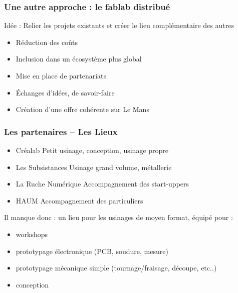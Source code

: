 \documentclass[10pt, compress]{beamer}
\begin{document}
	\begin{frame}
		\frametitle{Une autre approche : le fablab distribué}

		\begin{center}
			\alert{Idée :} Relier les projets existants et créer le lieu complémentaire des autres
		\end{center}

		\pause
		\begin{itemize}
			\item Réduction des coûts
			\item Inclusion dans un \alert{écosystème plus global}
			\item Mise en place de \alert{partenariats}
			\item \alert{Échanges d'idées}, de savoir-faire
			\item Création d'une \alert{offre cohérente} sur Le Mans
		\end{itemize}
	\end{frame}

	\begin{frame}
		\frametitle{Les partenaires -- Les Lieux}

		\begin{itemize}
			\item \alert{Créalab} Petit usinage, conception, usinage propre
			\item \alert{Les Subsistances} Usinage grand volume, métallerie
			\item \alert{La Ruche Numérique} Accompagnement des start-uppers
			\item \alert{HAUM} Accompagnement des particuliers
		\end{itemize}

		\pause

		Il manque donc : un lieu pour les usinages de moyen format, équipé pour :

		\pause

		\begin{itemize}[<+->]
			\item \alert{workshops}
			\item \alert{prototypage} électronique (PCB, soudure, mesure)
			\item \alert{prototypage} mécanique simple (tournage/fraisage, découpe, etc..)
			\item \alert{conception}
		\end{itemize}
	\end{frame}
\end{document}
